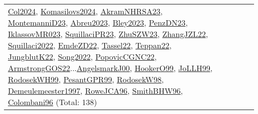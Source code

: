 {\begin{longtable}{p{3cm}r>{\raggedright\arraybackslash}p{6cm}>{\raggedright\arraybackslash}p{6cm}>{\raggedright\arraybackslash}p{8cm}}
\hyperref[detail:Col2024]{Col2024}, \hyperref[detail:Komasilovs2024]{Komasilovs2024}, \hyperref[detail:AkramNHRSA23]{AkramNHRSA23}, \hyperref[detail:MontemanniD23]{MontemanniD23}, \hyperref[detail:Abreu2023]{Abreu2023}, \hyperref[detail:Bley2023]{Bley2023}, \hyperref[detail:PenzDN23]{PenzDN23}, \hyperref[detail:IklassovMR023]{IklassovMR023}, \hyperref[detail:SquillaciPR23]{SquillaciPR23}, \hyperref[detail:ZhuSZW23]{ZhuSZW23}, \hyperref[detail:ZhangJZL22]{ZhangJZL22}, \hyperref[detail:Squillaci2022]{Squillaci2022}, \hyperref[detail:EmdeZD22]{EmdeZD22}, \hyperref[detail:Tassel22]{Tassel22}, \hyperref[detail:Teppan22]{Teppan22}, \hyperref[detail:JungblutK22]{JungblutK22}, \hyperref[detail:Song2022]{Song2022}, \hyperref[detail:PopovicCGNC22]{PopovicCGNC22}, \hyperref[detail:ArmstrongGOS22]{ArmstrongGOS22}...\hyperref[detail:AngelsmarkJ00]{AngelsmarkJ00}, \hyperref[detail:HookerO99]{HookerO99}, \hyperref[detail:JoLLH99]{JoLLH99}, \hyperref[detail:RodosekWH99]{RodosekWH99}, \hyperref[detail:PesantGPR99]{PesantGPR99}, \hyperref[detail:RodosekW98]{RodosekW98}, \hyperref[detail:Demeulemeester1997]{Demeulemeester1997}, \hyperref[detail:RoweJCA96]{RoweJCA96}, \hyperref[detail:SmithBHW96]{SmithBHW96}, \hyperref[detail:Colombani96]{Colombani96} (Total: 138)\\

\end{longtable}}
